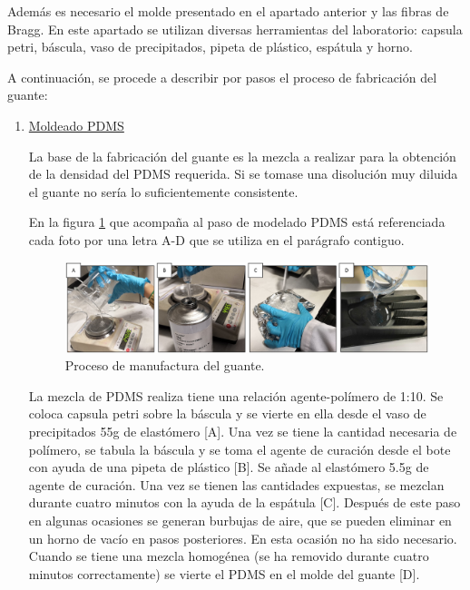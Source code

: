 \begin{itemize}
	

	Además es necesario el molde presentado en el apartado anterior y las fibras de Bragg. En este apartado se utilizan diversas herramientas del laboratorio: capsula petri, báscula, vaso de precipitados, pipeta de plástico, espátula y  horno. 
	

	A continuación, se procede a describir por pasos el proceso de fabricación del guante:
	\begin{enumerate}
		\item \underline{Moldeado PDMS}
		
		La base de la fabricación del guante es la mezcla a realizar para la obtención de la densidad del PDMS requerida. Si se tomase una disolución muy diluida el guante no sería lo suficientemente consistente. 
		
		
		En la figura \ref{fig:fabricacionGuante} que acompaña al paso de modelado PDMS está referenciada cada foto por una letra A-D que se utiliza en el parágrafo contiguo.
		
		\begin{figure}[H]
			\centering
			\includegraphics[width=1\textwidth]{./img/fabricacionGuante}
			\caption{Proceso de manufactura del guante.} \label{fig:fabricacionGuante}
		\end{figure}
		
		La mezcla de PDMS realiza tiene una relación agente-polímero de 1:10. Se coloca capsula petri sobre la báscula y se vierte en ella desde el vaso de precipitados 55g de elastómero [A]. Una vez se tiene la cantidad necesaria de polímero, se tabula la báscula y se toma el agente de curación desde el bote con ayuda de una pipeta de plástico [B]. Se añade al elastómero 5.5g de agente de curación. Una vez se tienen las cantidades expuestas, se mezclan durante cuatro minutos con la ayuda de la espátula [C]. Después de este paso en algunas ocasiones se generan burbujas de aire, que se pueden eliminar en un horno de vacío en pasos posteriores. En esta ocasión no ha sido necesario. Cuando se tiene una mezcla homogénea (se ha removido durante cuatro minutos correctamente) se vierte el PDMS en el molde del guante [D].  	
		

\end{enumerate}
\end{itemize}
